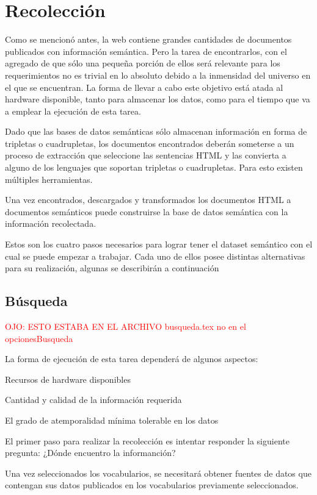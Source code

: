 \section{Recolección}

%
Como se mencionó antes, la web contiene grandes cantidades de documentos publicados con información semántica. Pero la tarea
de encontrarlos, con el agregado de que sólo una pequeña porción de ellos será relevante para los requerimientos no es trivial
en lo absoluto debido a la inmensidad del universo en el que se encuentran. La forma de llevar a cabo este objetivo está 
atada al hardware disponible, tanto para almacenar los datos, como para el tiempo que va a emplear la ejecución de esta 
tarea.  

Dado que las bases de datos semánticas sólo almacenan información en forma de tripletas o cuadrupletas, los documentos encontrados 
deberán someterse a un proceso de extracción que seleccione las sentencias HTML y las convierta a alguno de los lenguajes que soportan  
tripletas o cuadrupletas. Para esto existen múltiples herramientas. 

Una vez encontrados, descargados y transformados los documentos HTML a documentos semánticos puede construirse la base de datos semántica 
con la información recolectada. 

Estos son los cuatro pasos necesarios para lograr tener el dataset semántico con el cual se puede empezar a trabajar. Cada uno de ellos 
posee distintas alternativas para su realización, algunas se describirán a continuación 



\subsection{Búsqueda}
%
\textcolor{red}{OJO: ESTO ESTABA EN EL ARCHIVO busqueda.tex no en el opcionesBusqueda}


La forma de ejecución de esta tarea dependerá de algunos aspectos:

Recursos de hardware disponibles

Cantidad y calidad de la información requerida

El grado de atemporalidad mínima tolerable en los datos

El primer paso para realizar la recolección es intentar responder la siguiente pregunta: ¿Dónde encuentro la informanción?

Una vez seleccionados los vocabularios, se necesitará obtener fuentes de datos que contengan sus datos publicados en los vocabularios previamente seleccionados.
 
